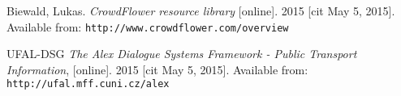 \begin{thebibliography}{99}
{\sc Biewald, Lukas.}
\emph{CrowdFlower resource library}
[online]. 2015 [cit May 5, 2015].
Available from: \nolinkurl{http://www.crowdflower.com/overview}

{\sc UFAL-DSG}
\emph{The Alex Dialogue Systems Framework - Public Transport Information},
[online]. 2015 [cit May 5, 2015].
Available from: \nolinkurl{http://ufal.mff.cuni.cz/alex}





 


\end{thebibliography}

